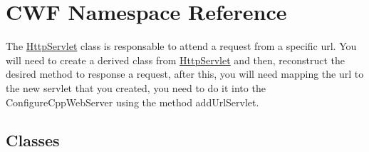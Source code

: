 \hypertarget{namespace_c_w_f}{\section{C\+W\+F Namespace Reference}
\label{namespace_c_w_f}
}


The \hyperlink{class_c_w_f_1_1_http_servlet}{Http\+Servlet} class is responsable to attend a request from a specific url. You will need to create a derived class from \hyperlink{class_c_w_f_1_1_http_servlet}{Http\+Servlet} and then, reconstruct the desired method to response a request, after this, you will need mapping the url to the new servlet that you created, you need to do it into the Configure\+Cpp\+Web\+Server using the method add\+Url\+Servlet.  


\subsection*{Classes}
